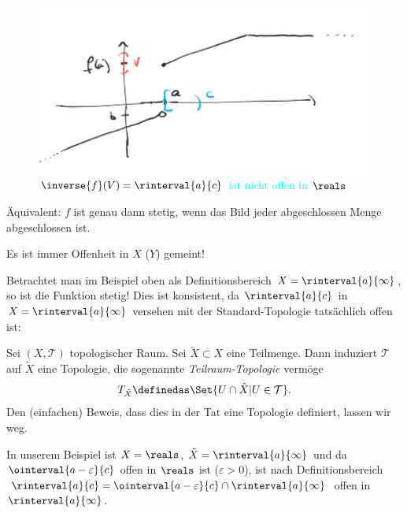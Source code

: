 \begin{figure}[H]
    \centering
    \includegraphics[width=0.8\linewidth]{figures/beispiel_urbild_offener_menge_unter_nicht_stetiger_abbildung_nicht_offen}
    \caption*{\textcolor{Cyan}{\( \inverse{f}(V)=\rinterval{a}{c} \) ist nicht offen in \( \reals \)}}
    \label{fig:beispiel_urbild_offener_menge_unter_nicht_stetiger_abbildung_nicht_offen}
\end{figure}
\begin{bemerkung*}
    Äquivalent: \( f \) ist genau dann stetig, wenn das Bild jeder abgeschlossen Menge abgeschlossen ist.
\end{bemerkung*}
Es ist immer Offenheit in \( X \) (\bzw \( Y \)) gemeint!

Betrachtet man im Beispiel oben als Definitionsbereich \( X=\rinterval{a}{\infty} \), so ist die Funktion stetig! 
Dies ist konsistent, da \( \rinterval{a}{c} \) in \( X=\rinterval{a}{\infty} \) versehen mit der Standard-Topologie tatsächlich offen ist:
\begin{defsatz}
    Sei \( (X,\mathcal{T}) \) topologischer Raum. Sei \( \tilde{X}\subset X \) eine Teilmenge. Dann induziert \( \mathcal{T} \) auf \( \tilde{X}  \) eine Topologie, die sogenannte \emph{Teilraum-Topologie} vermöge
    \begin{align*}
        T_{\tilde{X}}\definedas \Set{U\cap \tilde{X}|U\in \mathcal{T}}.
    \end{align*}
    Den (einfachen) Beweis, dass dies in der Tat eine Topologie definiert, lassen wir weg.
\end{defsatz}

In unserem Beispiel ist \( X=\reals \), \( \tilde{X}=\rinterval{a}{\infty} \) und da \( \ointerval{a-\varepsilon}{c} \) offen in \( \reals \) ist (\( \varepsilon>0 \)), ist nach Definitionsbereich \( \rinterval{a}{c}=\ointerval{a-\varepsilon}{c}\cap \rinterval{a}{\infty} \) offen in \( \rinterval{a}{\infty} \).

